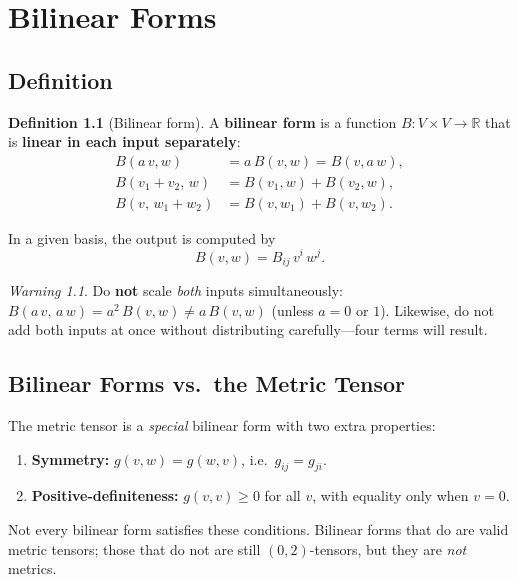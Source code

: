\documentclass[12pt, a4paper]{report}
\theoremstyle{definition}
\newtheorem{definition}{Definition}[chapter]
\theoremstyle{plain}
\theoremstyle{remark}
\newtheorem{warning}{Warning}[chapter]
\newcommand{\R}{\mathbb{R}}
\begin{document}
\chapter{Bilinear Forms}\label{ch:bilinear}

\section{Definition}

\begin{definition}[Bilinear form]
A \textbf{bilinear form} is a function $B : V \times V \to \R$ that is
\textbf{linear in each input separately}:
\begin{align}
    B(a\,v, w) &= a\,B(v, w) = B(v, a\,w), \label{eq:bf-scale}\\
    B(v_1 + v_2,\, w) &= B(v_1, w) + B(v_2, w), \label{eq:bf-add1}\\
    B(v,\, w_1 + w_2) &= B(v, w_1) + B(v, w_2). \label{eq:bf-add2}
\end{align}
\end{definition}

In a given basis, the output is computed by
\begin{equation}
    B(v,w) = B_{ij}\, v^{i}\, w^{j}.
\end{equation}

\begin{warning}
Do \textbf{not} scale \emph{both} inputs simultaneously:
$B(a\,v,\,a\,w) = a^{2}\,B(v,w) \neq a\,B(v,w)$
(unless $a = 0$ or $1$).  Likewise, do not add both inputs at once without
distributing carefully---four terms will result.
\end{warning}

\section{Bilinear Forms vs.\ the Metric Tensor}

The metric tensor is a \emph{special} bilinear form with two extra properties:
\begin{enumerate}[nosep]
    \item \textbf{Symmetry:} $g(v,w) = g(w,v)$, i.e.\ $g_{ij} = g_{ji}$.
    \item \textbf{Positive-definiteness:} $g(v,v) \geq 0$ for all $v$, with
          equality only when $v = 0$.
\end{enumerate}
Not every bilinear form satisfies these conditions.  Bilinear forms that do are
valid metric tensors; those that do not are still $(0,2)$-tensors, but they are
\emph{not} metrics.
\end{document}
